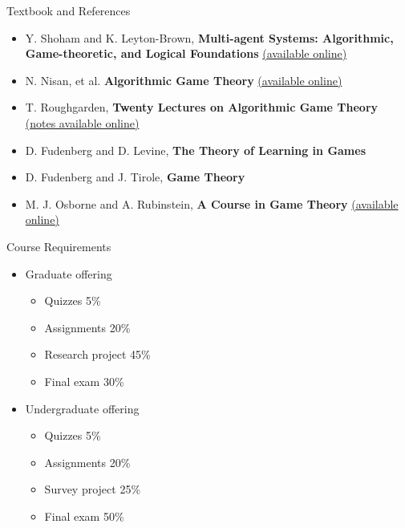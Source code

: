 \documentclass[11pt,aspectratio=169]{beamer}
\begin{document}
  \begin{frame}{Textbook and References}
   \footnotesize
   \begin{itemize}
    \setlength{\itemsep}{1em}
    \item Y. Shoham and K. Leyton-Brown, \textbf{Multi-agent Systems: Algorithmic, Game-theoretic, and Logical Foundations} \href{http://www.masfoundations.org/mas.pdf}{(available online)}
    \item	N. Nisan, et al. \textbf{Algorithmic Game Theory} \href{https://www.cs.cmu.edu/~sandholm/cs15-892F13/algorithmic-game-theory.pdf}{(available online)}
    \item T. Roughgarden, \textbf{Twenty Lectures on Algorithmic Game Theory} \href{https://timroughgarden.org/notes.html}{(notes available online)}
    \item D. Fudenberg and D. Levine, \textbf{The Theory of Learning in Games}
    \item D. Fudenberg and J. Tirole, \textbf{Game Theory}
    \item M. J. Osborne and A. Rubinstein, \textbf{A Course in Game Theory} \href{https://books.osborne.economics.utoronto.ca/}{(available online)}
   \end{itemize}
  \end{frame}
 
  \begin{frame}{Course Requirements}
   \begin{itemize}
    \item<+-> Graduate offering
    \begin{itemize}[<+-| alert@+>]
     \item Quizzes 5\%
     \item Assignments 20\%
     \item Research project 45\%
     \item Final exam 30\%
    \end{itemize}
    \vspace{1.4em}
    \item<+-> Undergraduate offering
    \begin{itemize}[<+-| alert@+>]
     \item Quizzes 5\%
     \item Assignments 20\%
     \item Survey project 25\%
     \item Final exam 50\%
    \end{itemize}
   \end{itemize}
  \end{frame}
 
\end{document}
